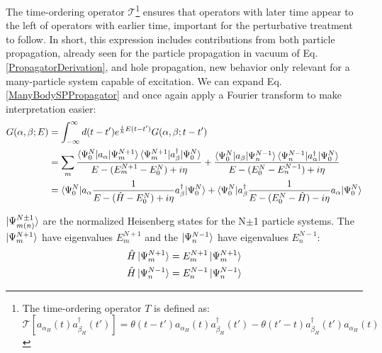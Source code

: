 \noindent
The time-ordering operator $\mathcal{T}$\footnote{
    The time-ordering operator $T$ is defined as:
    \begin{equation*}
        \mathcal{T}[a_{\alpha_{H}}(t)a^{\dagger}_{\beta_{H}}(t')]=\theta(t-t')a_{\alpha_{H}}(t)a^{\dagger}_{\beta_{H}}(t')
        -\theta(t'-t)a^{\dagger}_{\beta_{H}}(t')a_{\alpha_{H}}(t)
    \end{equation*}
} ensures that operators with later time appear to the left
of operators with earlier time, important for the perturbative treatment to follow.
In short, this expression includes contributions from both particle propagation, already seen for 
the particle
propagation in vacuum of Eq. \ref{PropagatorDerivation}, and hole propagation, new behavior only
relevant for a many-particle system capable of excitation. We can expand Eq.
\ref{ManyBodySPPropagator} and once again apply a Fourier transform to make
interpretation easier:
\begin{equation} \label{LehmannRepresentation}
    \begin{split}
        G(\alpha,\beta;E) & =
        \int_{-\infty}^{\infty}d(t-t')e^{\frac{i}{\hbar}E(t-t')}G(\alpha,\beta;t-t')\\
        & = \sum_m
        \frac{\braket{\Psi^{N}_{0}|a_{\alpha}|\Psi^{N+1}_{m}}\braket{\Psi^{N+1}_{m}|a^{\dagger}_{\beta}|\Psi^{N}_{0}}}
        {E-(E^{N+1}_{m}-E^{N}_{0})+i\eta} +
        \frac{\braket{\Psi^{N}_{0}|a_{\beta}|\Psi^{N-1}_{n}}\braket{\Psi^{N-1}_{n}|a^{\dagger}_{\alpha}|\Psi^{N}_{0}}}
        {E-(E^{N}_{0}-E^{N-1}_{n})+i\eta}\\
        & =
        \braket{\Psi^{N}_{0}|a_{\alpha}\frac{1}{E-(\hat{H}-E_{0}^{N})+i\eta}a^{\dagger}_{\beta}|\Psi^{N}_{0}} +
        \braket{\Psi^{N}_{0}|a^{\dagger}_{\beta}\frac{1}{E-(E^{N}_{0}-\hat{H})-i\eta}a_{\alpha}|\Psi^{N}_{0}}
    \end{split}
\end{equation}

\noindent
$\ket{\Psi^{N\pm1}_{m(n)}}$ are the normalized Heisenberg states for the N$\pm$1 particle 
systems. The $\ket{\Psi^{N+1}_{m}}$ have eigenvalues $E^{N+1}_{m}$ and the
$\ket{\Psi^{N-1}_{n}}$ have 
eigenvalues $E^{N-1}_{n}$:
\begin{equation}
    \begin{split}
        \hat{H}\ket{\Psi^{N+1}_{m}} & = E^{N+1}_{m}\ket{\Psi^{N+1}_{m}}\\
        \hat{H}\ket{\Psi^{N-1}_{n}} & = E^{N-1}_{n}\ket{\Psi^{N-1}_{n}}
    \end{split}
\end{equation}

